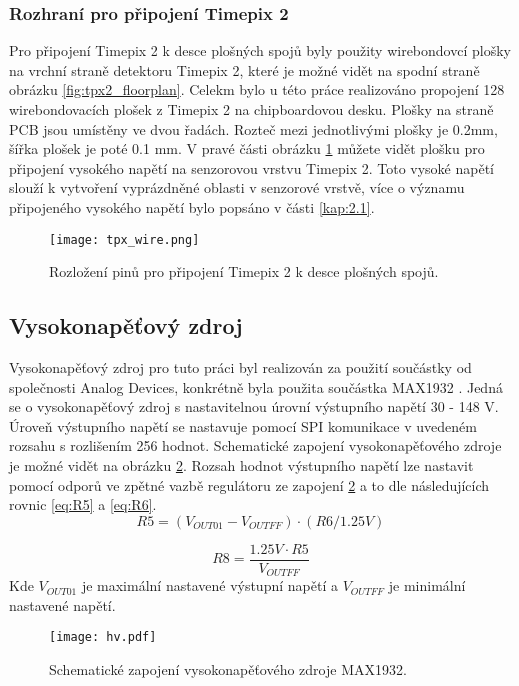 	\subsubsection{Rozhraní pro připojení Timepix 2}	%
	Pro připojení Timepix 2 k desce plošných spojů byly použity wirebondovcí plošky na vrchní straně detektoru Timepix 2, které je možné vidět na spodní straně obrázku \ref{fig:tpx2_floorplan}. Celekm bylo u této práce realizováno propojení 128 wirebondovacích plošek z Timepix 2 na chipboardovou desku. Plošky na straně PCB jsou umístěny ve dvou řadách. Rozteč mezi jednotlivými plošky je 0.2mm, šířka plošek je poté 0.1 mm. V pravé části obrázku \ref{fig:tpx_wire} můžete vidět plošku pro připojení vysokého napětí na senzorovou vrstvu Timepix 2. Toto vysoké napětí slouží k vytvoření vyprázdněné oblasti v senzorové vrstvě, více o významu připojeného vysokého napětí bylo popsáno v části \ref{kap:2.1}. 
	\begin{figure}[h!]
		\centering
		\captionsetup{justification=centering}
		\texttt{[image: tpx\_wire.png]}
		\caption{Rozložení pinů pro připojení Timepix 2 k desce plošných spojů.} 
		\label{fig:tpx_wire}
	\end{figure} 
	\subsection{Vysokonapěťový zdroj}	%
	\label{VN zdroj}
	Vysokonapěťový zdroj pro tuto práci byl realizován za použití součástky od společnosti Analog Devices, konkrétně byla použita součástka MAX1932 \cite{MAX1932}. Jedná se o vysokonapěťový zdroj s nastavitelnou úrovní výstupního napětí 30 - 148 V. Úroveň výstupního napětí se nastavuje pomocí SPI komunikace v uvedeném rozsahu s rozlišením 256 hodnot. Schematické zapojení vysokonapěťového zdroje je možné vidět na obrázku \ref{fig:hv}. Rozsah hodnot výstupního napětí lze nastavit pomocí odporů ve zpětné vazbě regulátoru ze zapojení \ref{fig:hv} a to dle následujících rovnic \ref{eq:R5} a \ref{eq:R6}. 
	\begin{equation}
		R5 = (V_{OUT01} - V_{OUTFF})\cdot (R6/1.25V)
		\label{eq:R5}
	\end{equation}

	\begin{equation}
		R8 = \frac{1.25V \cdot R5}{V_{OUTFF}}
		\label{eq:R6}
	\end{equation}
	Kde $V_{OUT01}$ je maximální nastavené výstupní napětí a $V_{OUTFF}$ je minimální nastavené napětí. 
	\begin{figure}[h!]
		\centering
		\captionsetup{justification=centering}
		\texttt{[image: hv.pdf]}
		\caption{Schematické zapojení vysokonapěťového zdroje MAX1932.} 
		\label{fig:hv}
	\end{figure} 
